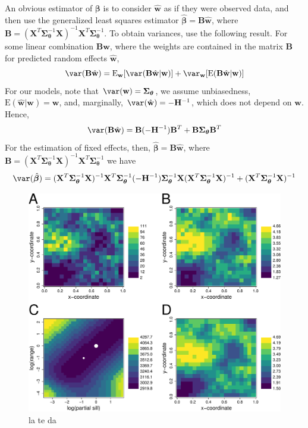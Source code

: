 \documentclass[12pt, titlepage]{article}
\begin{document}
An obvious estimator of $\boldsymbol{\beta}$ is to consider $\hat{\mathbf{w}}$ as if they were observed data, and then use the generalized least squares estimator $\hat{\boldsymbol{\beta}} = \mathbf{B}\hat{\mathbf{w}}$, where $\mathbf{B} = (\mathbf{X}^{T}\boldsymbol{\Sigma}_{\boldsymbol{\theta}}^{-1}\mathbf{X})^{-1}\mathbf{X}^{T}\boldsymbol{\Sigma}_{\boldsymbol{\theta}}^{-1}$.  To obtain variances, use the following result.  For some linear combination $\mathbf{B}\hat{\mathbf{w}}$, where the weights are contained in the matrix $\mathbf{B}$ for predicted random effects $\hat{\mathbf{w}}$, 
$$
\var(\mathbf{B}\hat{\mathbf{w}}) = \textrm{E}_{\mathbf{w}}[\var(\mathbf{B}\hat{\mathbf{w}}|\mathbf{w})] + \var_{\mathbf{w}}[\textrm{E}(\mathbf{B}\hat{\mathbf{w}}|\mathbf{w})]
$$
For our models, note that $\var(\mathbf{w}) = \boldsymbol{\Sigma_{\boldsymbol{\theta}}}$, we assume unbiasedness, $\textrm{E}(\hat{\mathbf{w}}|\mathbf{w}) = \mathbf{w}$, and, marginally, $\var(\hat{\mathbf{w}}) = -\mathbf{H}^{-1}$, which does not depend on $\mathbf{w}$.  Hence,
$$
\var(\mathbf{B}\hat{\mathbf{w}}) = \mathbf{B}(-\mathbf{H}^{-1})\mathbf{B}^{T} + \mathbf{B}\boldsymbol{\Sigma_{\boldsymbol{\theta}}}\mathbf{B}^{T}
$$ 
For the estimation of fixed effects, then, $\hat{\boldsymbol{\beta}} = \mathbf{B}\hat{\mathbf{w}}$, where $\mathbf{B} = (\mathbf{X}^{T}\boldsymbol{\Sigma}_{\boldsymbol{\theta}}^{-1}\mathbf{X})^{-1}\mathbf{X}^{T}\boldsymbol{\Sigma}_{\boldsymbol{\theta}}^{-1}$ we have
$$
\var(\hat{\boldsymbol{\beta}}) = (\mathbf{X}^{T}\boldsymbol{\Sigma}_{\boldsymbol{\theta}}^{-1}\mathbf{X})^{-1}\mathbf{X}^{T}\boldsymbol{\Sigma}_{\boldsymbol{\theta}}^{-1}(-\mathbf{H}^{-1})\boldsymbol{\Sigma}_{\boldsymbol{\theta}}^{-1}\mathbf{X}(\mathbf{X}^{T}\boldsymbol{\Sigma}_{\boldsymbol{\theta}}^{-1}\mathbf{X})^{-1} + (\mathbf{X}^{T}\boldsymbol{\Sigma}_{\boldsymbol{\theta}}^{-1}\mathbf{X})^{-1}
$$
\begin{figure}[H]
  \begin{center}
	    \includegraphics[width=.8\linewidth]{figures/sglm_likelihood_estimation}
  \end{center}
  \caption{la te da \label{Fig:sglm_likelihood_estimation}}
\end{figure}
\end{document}
